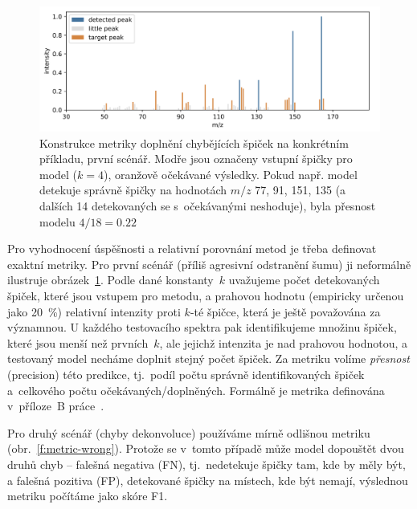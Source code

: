 \documentclass[a4paper,11pt]{article}
\begin{document}
\begin{figure}
\begin{center}
\includegraphics[width=.8\hsize]{metric-missing}
\end{center}
\caption{Konstrukce metriky doplnění chybějících špiček na konkrétním příkladu, první scénář.
Modře jsou označeny vstupní špičky pro model ($k=4$), oranžově očekávané výsledky.
Pokud např. model detekuje správně špičky na hodnotách $m/z$ 77, 91, 151, 135 (a dalších 14 detekovaných se
s~očekávanými neshoduje), byla přesnost modelu $4/18 = 0.22$
}
\label{f:metric-missing}
\end{figure}

Pro vyhodnocení úspěšnosti a relativní porovnání metod je třeba definovat exaktní metriky.
Pro první scénář (příliš agresivní odstranění šumu) ji 
neformálně ilustruje obrázek~\ref{f:metric-missing}.
Podle dané konstanty~$k$ uvažujeme počet detekovaných špiček, které jsou vstupem pro metodu,
a prahovou hodnotu (empiricky určenou jako 20~\%) relativní intenzity proti $k$-té špičce,
která je ještě považována za významnou. 
U každého testovacího spektra pak identifikujeme množinu špiček, které jsou menší než prvních~$k$,
ale jejichž intenzita je nad prahovou hodnotou, a testovaný model necháme doplnit stejný počet špiček.
Za metriku volíme \emph{přesnost} (precision) této predikce, tj.\ podíl počtu správně identifikovaných špiček
a~celkového počtu očekávaných/doplněných.
Formálně je metrika definována v~příloze~B práce~\cite{stary}. 

Pro druhý scénář (chyby dekonvoluce) používáme mírně odlišnou metriku (obr.~\ref{f:metric-wrong}).
Protože se v~tomto případě může model dopouštět dvou druhů chyb -- falešná negativa (FN), tj.\ nedetekuje špičky tam,
kde by měly být, a falešná pozitiva (FP), detekované špičky na místech, kde být nemají,
výslednou metriku počítáme jako skóre F1.
\end{document}
